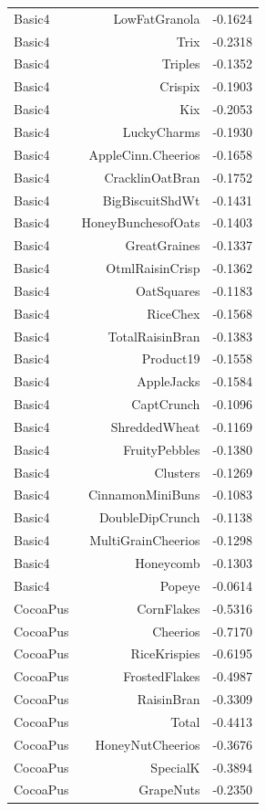 \begin{longtable}{@{}lrr@{}}
Basic4 & LowFatGranola & -0.1624 \\
Basic4 & Trix & -0.2318 \\
Basic4 & Triples & -0.1352 \\
Basic4 & Crispix & -0.1903 \\
Basic4 & Kix & -0.2053 \\
Basic4 & LuckyCharms & -0.1930 \\
Basic4 & AppleCinn.Cheerios & -0.1658 \\
Basic4 & CracklinOatBran & -0.1752 \\
Basic4 & BigBiscuitShdWt & -0.1431 \\
Basic4 & HoneyBunchesofOats & -0.1403 \\
Basic4 & GreatGraines & -0.1337 \\
Basic4 & OtmlRaisinCrisp & -0.1362 \\
Basic4 & OatSquares & -0.1183 \\
Basic4 & RiceChex & -0.1568 \\
Basic4 & TotalRaisinBran & -0.1383 \\
Basic4 & Product19 & -0.1558 \\
Basic4 & AppleJacks & -0.1584 \\
Basic4 & CaptCrunch & -0.1096 \\
Basic4 & ShreddedWheat & -0.1169 \\
Basic4 & FruityPebbles & -0.1380 \\
Basic4 & Clusters & -0.1269 \\
Basic4 & CinnamonMiniBuns & -0.1083 \\
Basic4 & DoubleDipCrunch & -0.1138 \\
Basic4 & MultiGrainCheerios & -0.1298 \\
Basic4 & Honeycomb & -0.1303 \\
Basic4 & Popeye & -0.0614 \\
CocoaPus & CornFlakes & -0.5316 \\
CocoaPus & Cheerios & -0.7170 \\
CocoaPus & RiceKrispies & -0.6195 \\
CocoaPus & FrostedFlakes & -0.4987 \\
CocoaPus & RaisinBran & -0.3309 \\
CocoaPus & Total & -0.4413 \\
CocoaPus & HoneyNutCheerios & -0.3676 \\
CocoaPus & SpecialK & -0.3894 \\
CocoaPus & GrapeNuts & -0.2350 \\

\end{longtable}

